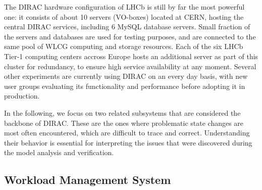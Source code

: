 \documentclass[sort&compress,preprint,3p]{elsarticle}
\begin{document}
The DIRAC hardware configuration of LHCb is still by far the most powerful one: it consists of about 10 servers (VO-boxes) located at CERN, hosting the central
DIRAC services, including 6 MySQL database servers. Small fraction of the servers and databases are used for testing purposes, and are connected
to the same pool of WLCG computing and storage resources. Each of the six LHCb Tier-1 computing centers accross Europe hosts an additional server as part of this cluster for redundancy,
to ensure high service availability at any moment. Several other experiments are currently using DIRAC on an every day basis, 
with new user groups evaluating its functionality and performance before adopting it in production.

In the following, we focus on two related subsystems that are considered the backbone of DIRAC. These
are the ones where problematic state changes are most often encountered,
 which are difficult to trace and correct. Understanding their behavior 
is essential for interpreting the issues that were discovered during the model analysis and verification.

\subsection{Workload Management System}
\end{document}
